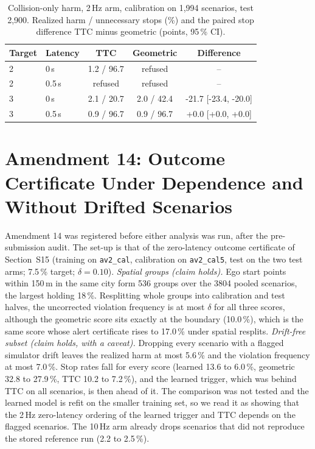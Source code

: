 \documentclass[lettersize,journal]{IEEEtran}
\begin{document}
\begin{table}[t]
\caption{Collision-only harm, 2\,Hz arm, calibration on 1{,}994 scenarios, test 2{,}900. Realized harm / unnecessary stops (\%) and the paired stop difference TTC minus geometric (points, 95\,\% CI).}
\label{tab:s-coll}
\centering
\scriptsize\setlength{\tabcolsep}{3pt}
\begin{tabular}{llccc}
\toprule
Target & Latency & TTC & Geometric & Difference \\
\midrule
2 & 0\,s & 1.2 / 96.7 & refused & -- \\
2 & 0.5\,s & refused & refused & -- \\
3 & 0\,s & 2.1 / 20.7 & 2.0 / 42.4 & -21.7 [-23.4, -20.0] \\
3 & 0.5\,s & 0.9 / 96.7 & 0.9 / 96.7 & +0.0 [+0.0, +0.0] \\
\bottomrule
\end{tabular}
\end{table}

\section{Amendment 14: Outcome Certificate Under Dependence and Without Drifted Scenarios}
\label{sec:s-a14}
Amendment 14 was registered before either analysis was run, after the pre-submission audit. The set-up is that of the zero-latency outcome certificate of Section~S15 (training on \texttt{av2\_cal}, calibration on \texttt{av2\_cal5}, test on the two test arms; 7.5\,\% target; \(\delta=0.10\)). \emph{Spatial groups (claim holds).} Ego start points within 150\,m in the same city form 536 groups over the 3804 pooled scenarios, the largest holding 18\,\%. Resplitting whole groups into calibration and test halves, the uncorrected violation frequency is at most \(\delta\) for all three scores, although the geometric score sits exactly at the boundary (10.0\,\%), which is the same score whose alert certificate rises to 17.0\,\% under spatial resplits. \emph{Drift-free subset (claim holds, with a caveat).} Dropping every scenario with a flagged simulator drift leaves the realized harm at most 5.6\,\% and the violation frequency at most 7.0\,\%. Stop rates fall for every score (learned 13.6 to 6.0\,\%, geometric 32.8 to 27.9\,\%, TTC 10.2 to 7.2\,\%), and the learned trigger, which was behind TTC on all scenarios, is then ahead of it. The comparison was not tested and the learned model is refit on the smaller training set, so we read it as showing that the 2\,Hz zero-latency ordering of the learned trigger and TTC depends on the flagged scenarios. The 10\,Hz arm already drops scenarios that did not reproduce the stored reference run (2.2 to 2.5\,\%).
\end{document}
